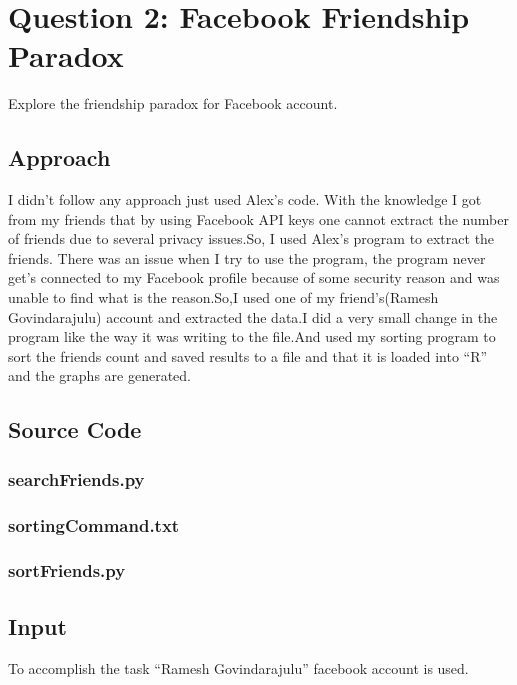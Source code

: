 \documentclass[12pt]{article}
\begin{document}
\section{Question 2: Facebook Friendship Paradox}
Explore the friendship paradox for Facebook account.
\subsection{Approach}
I didn't follow any approach just used Alex's code. With the knowledge I got from my friends that by using Facebook API keys one cannot extract the number of friends due to several privacy issues.So, I used Alex's program to extract the friends. There was an issue when I try to use the program, the program never get's connected to my Facebook profile because of some security reason and was unable to find what is the reason.So,I used one of my friend's(Ramesh Govindarajulu) account and extracted the data.I did a very small change in the program like the way it was writing to the file.And used my sorting program to sort the friends count and saved results to a file and that it is loaded into ``R'' and the graphs are generated.

\newpage
\subsection{Source Code}

\subsubsection{searchFriends.py}


\subsubsection{sortingCommand.txt}

\newpage
\subsubsection{sortFriends.py}

\newpage
\subsection{Input}
To accomplish the task ``Ramesh Govindarajulu'' facebook account is used.
\end{document}
